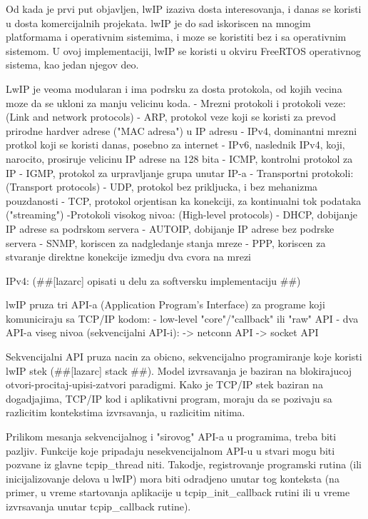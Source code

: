 \documentclass[a4paper,12pt, master]{etf}
\begin{document}
	Od kada je prvi put objavljen, lwIP izaziva dosta interesovanja, i danas se koristi u dosta
	komercijalnih projekata. lwIP je do sad iskoriscen na mnogim platformama i operativnim
	sistemima, i moze se koristiti bez i sa operativnim sistemom. U ovoj implementaciji, lwIP se
	koristi u okviru FreeRTOS operativnog sistema, kao jedan njegov deo.

	LwIP je veoma modularan i ima podrsku za dosta protokola, od kojih vecina moze da se ukloni za
	manju velicinu koda.
	- Mrezni protokoli i protokoli veze: (Link and network protocols)
		- ARP, protokol veze koji se koristi za prevod prirodne hardver adrese ("MAC adresa") u IP
		adresu
		- IPv4, dominantni mrezni protkol koji se koristi danas, posebno za internet
		- IPv6, naslednik IPv4, koji, narocito, prosiruje velicinu IP adrese na 128 bita
		- ICMP, kontrolni protokol za IP
		- IGMP, protokol za urpravljanje grupa unutar IP-a
	- Transportni protokoli: (Transport protocols)
		- UDP, protokol bez prikljucka, i bez mehanizma pouzdanosti
		- TCP, protokol orjentisan ka konekciji, za kontinualni tok podataka ("streaming")
	-Protokoli visokog nivoa: (High-level protocols)
		- DHCP, dobijanje IP adrese sa podrskom servera
		- AUTOIP, dobijanje IP adrese bez podrske servera
		- SNMP, koriscen za nadgledanje stanja mreze
		- PPP, koriscen za stvaranje direktne konekcije izmedju dva cvora na mrezi

	IPv4: (\#\#[lazarc] opisati u delu za softversku implementaciju \#\#)

	lwIP pruza tri API-a (Application Program's Interface) za programe koji komuniciraju sa TCP/IP
	kodom:
		- low-level "core"/"callback" ili "raw" API
		- dva API-a viseg nivoa (sekvencijalni API-i):
			-> netconn API
			-> socket API

	Sekvencijalni API pruza nacin za obicno, sekvencijalno programiranje koje koristi lwIP stek
	(\#\#[lazarc] stack \#\#). Model izvrsavanja je baziran na blokirajucoj
	otvori-procitaj-upisi-zatvori paradigmi. Kako je TCP/IP stek baziran na dogadjajima, TCP/IP kod
	i aplikativni program, moraju da se pozivaju sa razlicitim kontekstima izvrsavanja, u
	razlicitim nitima.

	Prilikom mesanja sekvencijalnog i "sirovog" API-a u programima, treba biti pazljiv. Funkcije
	koje pripadaju nesekvencijalnom API-u u stvari mogu biti pozvane iz glavne tcpip\_thread niti.
	Takodje, registrovanje programski rutina (ili inicijalizovanje delova u lwIP) mora biti
	odradjeno unutar tog konteksta (na primer, u vreme startovanja aplikacije u tcpip\_init\_callback
	rutini ili u vreme izvrsavanja unutar tcpip\_callback rutine).
\end{document}
